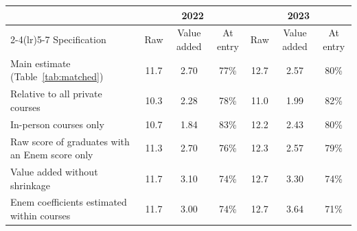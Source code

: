 \begin{tabular}{lcccccc}
\toprule
 & \multicolumn{3}{c}{2022} & \multicolumn{3}{c}{2023} \\
\cmidrule(lr){2-4}\cmidrule(lr){5-7}
Specification & Raw & Value added & At entry & Raw & Value added & At entry \\
\midrule
Main estimate (Table~\ref{tab:matched}) & 11.7 & 2.70 & 77\% & 12.7 & 2.57 & 80\% \\
Relative to all private courses & 10.3 & 2.28 & 78\% & 11.0 & 1.99 & 82\% \\
In-person courses only & 10.7 & 1.84 & 83\% & 12.2 & 2.43 & 80\% \\
Raw score of graduates with an Enem score only & 11.3 & 2.70 & 76\% & 12.3 & 2.57 & 79\% \\
Value added without shrinkage & 11.7 & 3.10 & 74\% & 12.7 & 3.30 & 74\% \\
Enem coefficients estimated within courses & 11.7 & 3.00 & 74\% & 12.7 & 3.64 & 71\% \\
\bottomrule
\end{tabular}